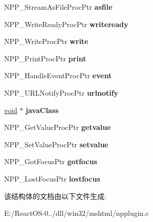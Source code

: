 \begin{DoxyCompactItemize}
N\+P\+P\+\_\+\+Stream\+As\+File\+Proc\+Ptr {\bfseries asfile}
\item 
\mbox{\label{struct___n_p_plugin_funcs_ac195e383405cb0f4f0483aaa9afcf59f}} 
N\+P\+P\+\_\+\+Write\+Ready\+Proc\+Ptr {\bfseries writeready}
\item 
\mbox{\label{struct___n_p_plugin_funcs_a4469cc48ef16ecb1f4f62aab97b977c4}} 
N\+P\+P\+\_\+\+Write\+Proc\+Ptr {\bfseries write}
\item 
\mbox{\label{struct___n_p_plugin_funcs_ae472fb122d9dcdb7ac9d89206b0002dd}} 
N\+P\+P\+\_\+\+Print\+Proc\+Ptr {\bfseries print}
\item 
\mbox{\label{struct___n_p_plugin_funcs_a77c082393e65906b4131934d39ed7ac5}} 
N\+P\+P\+\_\+\+Handle\+Event\+Proc\+Ptr {\bfseries event}
\item 
\mbox{\label{struct___n_p_plugin_funcs_a9a8a9425b6531d5b77f0bdc3ab779e7c}} 
N\+P\+P\+\_\+\+U\+R\+L\+Notify\+Proc\+Ptr {\bfseries urlnotify}
\item 
\mbox{\label{struct___n_p_plugin_funcs_af5b980573ff4092423a02ec7bc742f60}} 
\hyperlink{interfacevoid}{void} $\ast$ {\bfseries java\+Class}
\item 
\mbox{\label{struct___n_p_plugin_funcs_a0da6676c010699f0a6ef72d20aae2508}} 
N\+P\+P\+\_\+\+Get\+Value\+Proc\+Ptr {\bfseries getvalue}
\item 
\mbox{\label{struct___n_p_plugin_funcs_ae0c7a9ca048cad9eec7d7d69df311bdf}} 
N\+P\+P\+\_\+\+Set\+Value\+Proc\+Ptr {\bfseries setvalue}
\item 
\mbox{\label{struct___n_p_plugin_funcs_a073e00f7dec65a3412a78500df5f13a7}} 
N\+P\+P\+\_\+\+Got\+Focus\+Ptr {\bfseries gotfocus}
\item 
\mbox{\label{struct___n_p_plugin_funcs_a2c55b0340e00a495963d64b4301a4cb0}} 
N\+P\+P\+\_\+\+Lost\+Focus\+Ptr {\bfseries lostfocus}
\end{DoxyCompactItemize}


该结构体的文档由以下文件生成\+:\begin{DoxyCompactItemize}
\item 
E\+:/\+React\+O\+S-\/0../dll/win32/mshtml/npplugin.\+c\end{DoxyCompactItemize}

